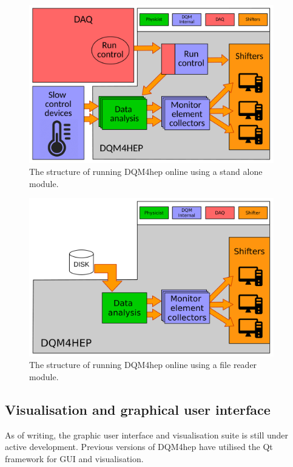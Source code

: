 \begin{figure}
	\centering
	\includegraphics[width=0.95\textwidth]{../Pictures/StandaloneModuleArchitecture.pdf}
	\caption{The structure of running DQM4hep online using a stand alone module.}
	\label{figure:daq/dqm4hep/standalone-module}
\end{figure}

\begin{figure}
	\centering
	\includegraphics[width=0.95\textwidth]{../Pictures/FileReaderModuleArchitecture.pdf}
	\caption{The structure of running DQM4hep online using a file reader module.}
	\label{figure:daq/dqm4hep/file-reader}
\end{figure}

\subsection{Visualisation and graphical user interface}
As of writing, the graphic user interface and visualisation suite is still under active development. Previous versions of DQM4hep have utilised the Qt framework for GUI and visualisation.

